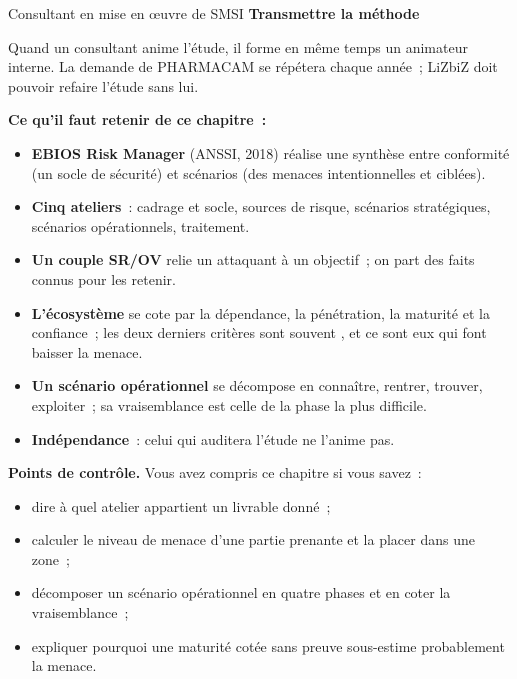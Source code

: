\begin{boxmetier}{Consultant en mise en œuvre de SMSI}
\textbf{Transmettre la méthode}

Quand un consultant anime l'étude, il forme en même temps un animateur
interne. La demande de PHARMACAM se répétera chaque année~; LiZbiZ doit
pouvoir refaire l'étude sans lui.
\end{boxmetier}

\separateur

\begin{boxresume}
\textbf{Ce qu'il faut retenir de ce chapitre~:}
\begin{itemize}
    \item \textbf{EBIOS Risk Manager} (ANSSI, 2018) réalise une synthèse
          entre conformité (un socle de sécurité) et scénarios (des menaces
          intentionnelles et ciblées).
    \item \textbf{Cinq ateliers}~: cadrage et socle, sources de risque,
          scénarios stratégiques, scénarios opérationnels, traitement.
    \item \textbf{Un couple SR/OV} relie un attaquant à un objectif~; on
          part des faits connus pour les retenir.
    \item \textbf{L'écosystème} se cote par la dépendance, la pénétration,
          la maturité et la confiance~; les deux derniers critères sont
          souvent \NEK{}, et ce sont eux qui font baisser la menace.
    \item \textbf{Un scénario opérationnel} se décompose en connaître,
          rentrer, trouver, exploiter~; sa vraisemblance est celle de la
          phase la plus difficile.
    \item \textbf{Indépendance}~: celui qui auditera l'étude ne l'anime pas.
\end{itemize}
\end{boxresume}

\begin{boxinfo}
\textbf{Points de contrôle.} Vous avez compris ce chapitre si vous savez~:
\begin{itemize}
    \item dire à quel atelier appartient un livrable donné~;
    \item calculer le niveau de menace d'une partie prenante et la placer
          dans une zone~;
    \item décomposer un scénario opérationnel en quatre phases et en coter
          la vraisemblance~;
    \item expliquer pourquoi une maturité cotée sans preuve sous-estime
          probablement la menace.
\end{itemize}
\end{boxinfo}

